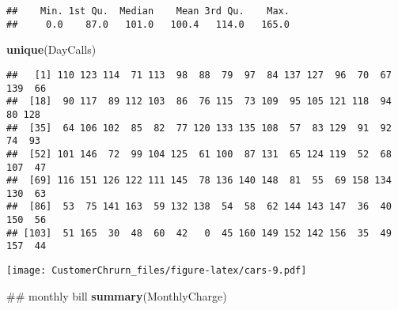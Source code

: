 \documentclass[]{article}
\newenvironment{Shaded}{\begin{snugshade}}{\end{snugshade}}
\newcommand{\KeywordTok}[1]{\textcolor[rgb]{0.13,0.29,0.53}{\textbf{#1}}}
\newcommand{\DataTypeTok}[1]{\textcolor[rgb]{0.13,0.29,0.53}{#1}}
\newcommand{\DecValTok}[1]{\textcolor[rgb]{0.00,0.00,0.81}{#1}}
\newcommand{\StringTok}[1]{\textcolor[rgb]{0.31,0.60,0.02}{#1}}
\newcommand{\OperatorTok}[1]{\textcolor[rgb]{0.81,0.36,0.00}{\textbf{#1}}}
\newcommand{\NormalTok}[1]{#1}
\begin{document}
\begin{verbatim}
##    Min. 1st Qu.  Median    Mean 3rd Qu.    Max. 
##     0.0    87.0   101.0   100.4   114.0   165.0
\end{verbatim}

\begin{Shaded}
\begin{Highlighting}[]
\KeywordTok{unique}\NormalTok{(DayCalls)}
\end{Highlighting}
\end{Shaded}

\begin{verbatim}
##   [1] 110 123 114  71 113  98  88  79  97  84 137 127  96  70  67 139  66
##  [18]  90 117  89 112 103  86  76 115  73 109  95 105 121 118  94  80 128
##  [35]  64 106 102  85  82  77 120 133 135 108  57  83 129  91  92  74  93
##  [52] 101 146  72  99 104 125  61 100  87 131  65 124 119  52  68 107  47
##  [69] 116 151 126 122 111 145  78 136 140 148  81  55  69 158 134 130  63
##  [86]  53  75 141 163  59 132 138  54  58  62 144 143 147  36  40 150  56
## [103]  51 165  30  48  60  42   0  45 160 149 152 142 156  35  49 157  44
\end{verbatim}

\begin{Shaded}
\end{Shaded}

\texttt{[image: CustomerChrurn\_files/figure-latex/cars-9.pdf]}

\begin{Shaded}
\begin{Highlighting}[]
\NormalTok{## monthly bill}
\KeywordTok{summary}\NormalTok{(MonthlyCharge)}
\end{Highlighting}
\end{Shaded}
\end{document}
